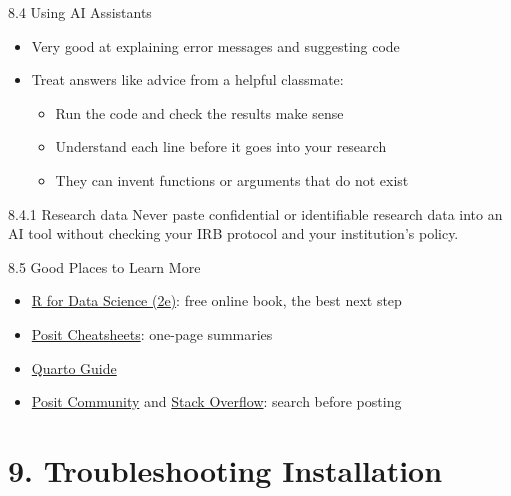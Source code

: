 \documentclass[
  ignorenonframetext,
  aspectratio=169,
]{beamer}
\providecommand{\tightlist}{%
  \setlength{\itemsep}{0pt}\setlength{\parskip}{0pt}}
\begin{document}
\begin{frame}{8.4 Using AI Assistants}
\protect{}\label{using-ai-assistants}
\begin{itemize}
\tightlist
\item
  Very good at explaining error messages and suggesting code
\item
  Treat answers like advice from a helpful classmate:

  \begin{itemize}
  \tightlist
  \item
    Run the code and check the results make sense
  \item
    Understand each line before it goes into your research
  \item
    They can invent functions or arguments that do not exist
  \end{itemize}
\end{itemize}

\begin{alertblock}{8.4.1 Research data}
\protect{}\label{research-data}
Never paste confidential or identifiable research data into an AI tool
without checking your IRB protocol and your institution's policy.
\end{alertblock}
\end{frame}

\begin{frame}{8.5 Good Places to Learn More}
\protect{}\label{good-places-to-learn-more}
\begin{itemize}
\tightlist
\item
  \href{https://r4ds.hadley.nz/}{R for Data Science (2e)}: free online
  book, the best next step
\item
  \href{https://posit.co/resources/cheatsheets/}{Posit Cheatsheets}:
  one-page summaries
\item
  \href{https://quarto.org/docs/guide/}{Quarto Guide}
\item
  \href{https://forum.posit.co/}{Posit Community} and
  \href{https://stackoverflow.com/questions/tagged/r}{Stack Overflow}:
  search before posting
\end{itemize}
\end{frame}

\section{9. Troubleshooting Installation}\label{sec-troubleshoot}
\end{document}
